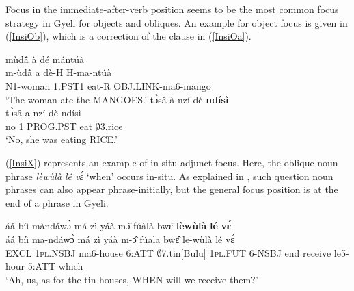 Focus in the immediate-after-verb position seems to be the most common focus strategy in Gyeli for objects and obliques. An example for object focus is given in (\ref{InsiOb}), which is a correction of the clause in (\ref{InsiOa}). 

\begin{exe} 
\ex\label{InsiO} 
\begin{xlist}
\ex\label{InsiOa}
   \glll mùdã̂ à dé mántúà\\
         m-ùdã̂ a dè-H H-ma-ntúà  \\
        N1-woman 1.PST1 eat-R OBJ.LINK-ma6-mango \\
    \trans `The woman ate the MANGOES.'
\ex \label{InsiOb}
  \glll tɔ̀sâ à nzí dè {\bfseries ndísì} \\
     tɔ̀sâ a nzí dè ndísì \\
       no 1 PROG.PST eat $\emptyset$3.rice  \\
    \trans `No, she was eating RICE.'
\end {xlist}
\end{exe}

(\ref{InsiX}) represents an example of in-situ adjunct focus. Here, the oblique noun phrase {\itshape lèwùlà lé vɛ́} `when' occurs in-situ. As explained in , such question noun phrases can also appear phrase-initially, but the general focus position is at the end of a phrase in Gyeli.


\begin{exe} 
\ex\label{InsiX}
  \glll     áá bíì màndáwɔ̀ má zì yáà mɔ̂ fúàlà bwɛ̂ {\bfseries lèwùlà} {\bfseries lé} {\bfseries vɛ́}\\
          áá bíì ma-ndáwɔ̀ má zì yáà m-ɔ̂ fúala bwɛ̂ le-wùlà lé vɛ́\\
              EXCL 1\textsc{pl}.NSBJ ma6-house 6:ATT $\emptyset$7.tin[Bulu] 1\textsc{pl}.FUT 6-NSBJ end receive le5-hour 5:ATT which \\
    \trans `Ah, us, as for the tin houses, WHEN will we receive them?'
\end{exe}


